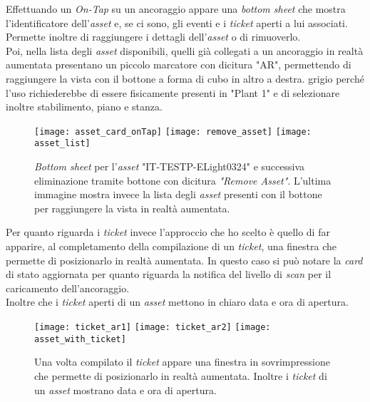Effettuando un \textit{On-Tap} su un ancoraggio appare una \textit{bottom sheet} che mostra l'identificatore dell'\textit{asset} e, se ci sono, gli eventi e i \textit{ticket} aperti a lui associati. Permette inoltre di raggiungere i dettagli dell'\textit{asset} o di rimuoverlo.\\
Poi, nella lista degli \textit{asset} disponibili, quelli già collegati a un ancoraggio in realtà aumentata presentano un piccolo marcatore con dicitura "AR", permettendo di raggiungere la vista con il bottone a forma di cubo in altro a destra. \e{} grigio perché l'uso richiederebbe di essere fisicamente presenti in "Plant 1" e di selezionare inoltre stabilimento, piano e stanza.
\newpage
\begin{figure}[H]
  \centering
  \texttt{[image: asset\_card\_onTap]}\hfill
  \texttt{[image: remove\_asset]}\hfill
  \texttt{[image: asset\_list]}
  \caption[\textit{Bottom sheet asset} per eliminazione e lista \textit{asset}]{\textit{Bottom sheet} per l'\textit{asset} "IT-TESTP-ELight0324" e successiva eliminazione tramite bottone con dicitura \textit{"Remove Asset"}. L'ultima immagine mostra invece la lista degli \textit{asset} presenti con il bottone per raggiungere la vista in realtà aumentata.}
  \label{fig:asset_list}
\end{figure}

Per quanto riguarda i \textit{ticket} invece l'approccio che ho scelto è quello di far apparire, al completamento della compilazione di un \textit{ticket}, una finestra che permette di posizionarlo in realtà aumentata. In questo caso si può notare la \textit{card} di stato aggiornata per quanto riguarda la notifica del livello di \textit{scan} per il caricamento dell'ancoraggio.\\
Inoltre che i \textit{ticket} aperti di un \textit{asset} mettono in chiaro data e ora di apertura.
\begin{figure}[H]
  \centering
  \texttt{[image: ticket\_ar1]}\hfill
  \texttt{[image: ticket\_ar2]}\hfill
  \texttt{[image: asset\_with\_ticket]}
  \caption[Caricamento \textit{ticket} realtà aumentata e \textit{ticket} su \textit{asset}]{Una volta compilato il \textit{ticket} appare una finestra in sovrimpressione che permette di posizionarlo in realtà aumentata. Inoltre i \textit{ticket} di un \textit{asset} mostrano data e ora di apertura.}
  \label{fig:ticket_ar}
\end{figure}


